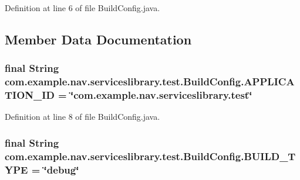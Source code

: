 Definition at line 6 of file Build\+Config.\+java.



\subsection{Member Data Documentation}
\subsubsection[{\texorpdfstring{A\+P\+P\+L\+I\+C\+A\+T\+I\+O\+N\+\_\+\+ID}{APPLICATION_ID}}]{\setlength{\rightskip}{0pt plus 5cm}final String com.\+example.\+nav.\+serviceslibrary.\+test.\+Build\+Config.\+A\+P\+P\+L\+I\+C\+A\+T\+I\+O\+N\+\_\+\+ID = \char`\"{}com.\+example.\+nav.\+serviceslibrary.\+test\char`\"{}\hspace{0.3cm}{\ttfamily [static]}}\hypertarget{classcom_1_1example_1_1nav_1_1serviceslibrary_1_1test_1_1_build_config_aef637b3aa9cd6e92b64d500992a845b9}{}\label{classcom_1_1example_1_1nav_1_1serviceslibrary_1_1test_1_1_build_config_aef637b3aa9cd6e92b64d500992a845b9}


Definition at line 8 of file Build\+Config.\+java.

\subsubsection[{\texorpdfstring{B\+U\+I\+L\+D\+\_\+\+T\+Y\+PE}{BUILD_TYPE}}]{\setlength{\rightskip}{0pt plus 5cm}final String com.\+example.\+nav.\+serviceslibrary.\+test.\+Build\+Config.\+B\+U\+I\+L\+D\+\_\+\+T\+Y\+PE = \char`\"{}debug\char`\"{}\hspace{0.3cm}{\ttfamily [static]}}\hypertarget{classcom_1_1example_1_1nav_1_1serviceslibrary_1_1test_1_1_build_config_ab93b2d43a9178d122d8e06db29afcec6}{}\label{classcom_1_1example_1_1nav_1_1serviceslibrary_1_1test_1_1_build_config_ab93b2d43a9178d122d8e06db29afcec6}


